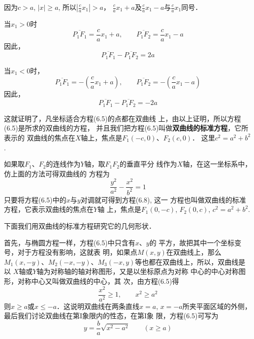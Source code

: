 因为$c>a$, $|x|\ge a$, 所以$\left|\frac{c}{a}x_1\right|>a$，
$\frac{c}{a}x_1+a$及$\frac{c}{a}x_1-a$与$\frac{c}{a}x_1$同号．

当$x_1>0$时
\[\overline{P_1F_1}=\frac{c}{a}x_1+a,\qquad \overline{P_1F_2}=\frac{c}{a}x_1-a\]
因此，
\[\overline{P_1F_1}-\overline{P_1F_2}=2a\]

当$x_1<0$时，
\[\overline{P_1F_1}=-\left(\frac{c}{a}x_1+a\right),\qquad \overline{P_1F_2}=-\left(\frac{c}{a}x_1-a\right)\]
因此，
\[\overline{P_1F_1}-\overline{P_1F_2}=-2a\]

这就证明了，凡坐标适合方程(6.5)的点都在双曲线
上，由以上证明，所以方程(6.5)是所求的双曲线的方程，
并且我们把方程(6.5)叫做\textbf{双曲线的标准方程}，它所表示的
双曲线的焦点在$X$轴上，焦点是$F_1(-c,0)$、$F_2(c,0)$．
这里$c^2=a^2+b^2$.

如果取$F_1$、$F_2$的连线作为$Y$轴，取$F_1F_2$的垂直平分
线作为$X$轴，在这一坐标系中，仿上面的方法可得双曲线的
方程为
\begin{equation}
    \boxed{\frac{y^2}{a^2}-\frac{x^2}{b^2}=1}
\end{equation}
只要将方程(6.5)中的$x$与$y$对调就可得到方程(6.8), 这一
方程也叫做双曲线的标准方程，它表示双曲线的焦点在$Y$轴
上，焦点是$F_1(0,-c)$, $F_2(0,c)$, $c^2=a^2+b^2$.

下面我们用双曲线的标准方程研究它的几何形状．

首先，与椭圆方程一样，方程(6.5)中只含有$x$、$y$的
平方，故把其中一个坐标变号，对于方程没有影响，这就表
明，如果点$M(x,y)$在双曲线上，那么$M_1(x,-y)$、$M_2(-x,
-y)$、$M_3(-x,y)$等也都在双曲线上，所以，双曲线是以
$X$轴或$Y$轴为对称轴的轴对称图形，又是以坐标原点为对称
中心的中心对称图形，对称中心又叫做双曲线的中心，其
次，由方程(6.5)得
\[\frac{x^2}{a^2}\ge 1,\qquad x^2\ge a^2\]
则$x\ge a$或$x\le -a$．这说明双曲线在两条直线$x=a$, $x=-a$所夹平面区域的外侧，最后我们讨论双曲线在第I象限内的性态，在第I象
限，方程(6.5)可写为
\[y=\frac{b}{a}\sqrt{x^2-a^2}\qquad (x\ge a)\]

\begin{figure}[htp]
    \centering
{}
    \caption{}
\end{figure}

